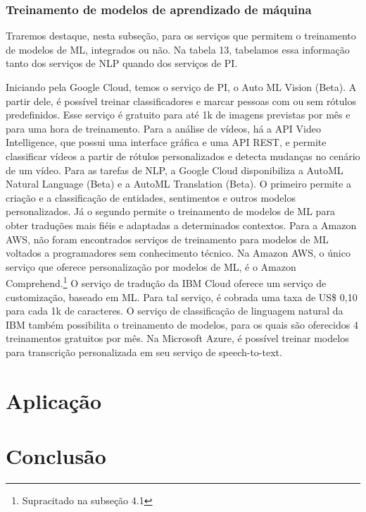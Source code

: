 \documentclass{article}
\begin{document}
\subsubsection{Treinamento de modelos de aprendizado de máquina}
Traremos destaque, nesta subseção, para os serviços que permitem o treinamento de modelos de ML, integrados ou não. Na tabela 13, tabelamos essa informação tanto dos serviços de NLP quando dos serviços de PI.

Iniciando pela Google Cloud, temos o serviço de PI, o Auto ML Vision (Beta). A partir dele, é possível treinar classificadores e marcar pessoas com ou sem rótulos predefinidos. Esse serviço é gratuito para até 1k de imagens previstas por mês e para uma hora de treinamento. Para a análise de vídeos, há a API Video Intelligence, que possui uma interface gráfica e uma API REST, e permite classificar vídeos a partir de rótulos personalizados e detecta mudanças no cenário de um vídeo. Para as tarefas de NLP, a Google Cloud disponibiliza a AutoML Natural Language (Beta) e a AutoML Translation (Beta). O primeiro permite a criação e a classificação de entidades, sentimentos e outros modelos personalizados. Já o segundo permite o treinamento de modelos de ML para obter traduções mais fiéis e adaptadas a determinados contextos. Para a Amazon AWS, não foram encontrados serviços de treinamento para modelos de ML voltados a programadores sem conhecimento técnico. Na Amazon AWS, o único serviço que oferece personalização por modelos de ML, é o Amazon Comprehend.\footnote{Supracitado na subseção 4.1}
O serviço de tradução da IBM Cloud oferece um serviço de customização, baseado em ML. Para tal serviço, é cobrada uma taxa de US\$ 0,10 para cada 1k de caracteres. O serviço de classificação de linguagem natural da IBM também possibilita o treinamento de modelos, para os quais são oferecidos 4 treinamentos gratuitos por mês. Na Microsoft Azure, é possível treinar modelos para transcrição personalizada em seu serviço de speech-to-text.

\section{Aplicação}

\section{Conclusão}

\printbibliography
\end{document}
